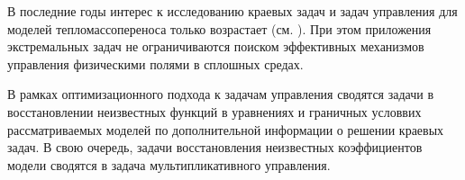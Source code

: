 В последние годы интерес к исследованию краевых задач и задач управления для моделей тепломассопереноса только возрастает (см. \cite{lit1,lit15}). При этом приложения экстремальных задач не ограничиваются поиском эффективных механизмов управления физическими полями в сплошных средах.

В рамках оптимизационного подхода к задачам управления сводятся задачи в восстановлении неизвестных функций в уравнениях и граничных условвих рассматриваемых моделей по дополнительной информации о решении краевых задач. В свою очередь, задачи восстановления неизвестных коэффициентов модели сводятся в задача мультипликативного управления.